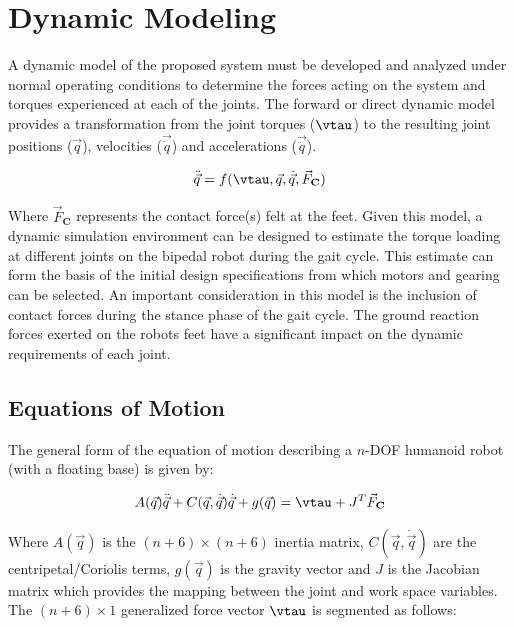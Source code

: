 
\section{Dynamic Modeling} %
\label{sec:designspec}

A dynamic model of the proposed system must be developed and analyzed under normal operating conditions to determine the forces acting on the system and torques experienced at each of the joints. The forward or direct dynamic model provides a transformation from the joint torques ($\vtau$) to the resulting joint positions ($\vec{q}$), velocities ($\vec{\dot{q}}$) and accelerations ($\vec{\ddot{q}}$).

\begin{equation}
	\ddot{\vec{q}} = f(\vtau, \vec{q}, \dot{\vec{q}}, \vec{F}_{\mathbf{C}})
\end{equation}

Where $\vec{F}_{\mathbf{C}}$ represents the contact force(s) felt at the feet. Given this model, a dynamic simulation environment can be designed to estimate the torque loading at different joints on the bipedal robot during the gait cycle. This estimate can form the basis of the initial design specifications from which motors and gearing can be selected. An important consideration in this model is the inclusion of contact forces during the stance phase of the gait cycle. The ground reaction forces exerted on the robots feet have a significant impact on the dynamic requirements of each joint.

\subsection{Equations of Motion} %
\label{sec:forward_dynamics}

The general form of the equation of motion describing a $n$-DOF humanoid robot (with a floating base) is given by: 

\begin{equation}
	\label{eq:eom1}
	A(\vec{q})\ddot{\vec{q}} + C(\vec{q},\dot{\vec{q}})\dot{\vec{q}} + g(\vec{q}) = \vtau + J^{T} \vec{F}_{\mathbf{C}}
\end{equation}

Where $A(\vec{q})$ is the $(n+6) \times (n+6)$ inertia matrix, $C(\vec{q},\dot{\vec{q}})$ are the centripetal/Coriolis terms, $g(\vec{q})$ is the gravity vector and $J$ is the Jacobian matrix which provides the mapping between the joint and work space variables. The $(n+6) \times 1$ generalized force vector $\vtau$ is segmented as follows:

